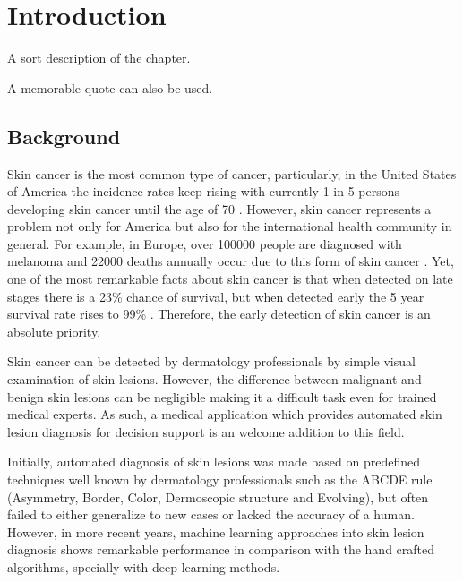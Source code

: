 

\chapter{Introduction}
\label{chapter:introduction}

\begin{introduction}
    A sort description of the chapter.
    
    A memorable quote can also be used.
\end{introduction}

\section{Background}
    Skin cancer is the most common type of cancer, particularly, in the United States of America the incidence rates keep rising with currently 1 in 5 persons developing skin cancer until the age of 70 \cite{Foundation2019}. However, skin cancer represents a problem not only for America but also for the international health community in general. For example, in Europe, over 100000 people are diagnosed with melanoma and 22000 deaths annually occur due to this form of skin cancer \cite{Bray2018}.  Yet, one of the most remarkable facts about skin cancer is that when detected on late stages there is a 23\% chance of survival, but when detected early the 5 year survival rate rises to 99\% \cite{Foundation2019}. Therefore, the early detection of skin cancer is an absolute priority. \par
    Skin cancer can be detected by dermatology professionals by simple visual examination of skin lesions. However, the difference between malignant and benign skin lesions can be negligible making it a difficult task even for trained medical experts. As such, a medical application which provides automated skin lesion diagnosis for decision support is an welcome addition to this field. \par
    Initially, automated diagnosis of skin lesions was made based on predefined techniques well known by dermatology professionals such as the ABCDE rule (Asymmetry, Border, Color, Dermoscopic structure and Evolving), but often failed to either generalize to new cases or lacked the accuracy of a human. However, in more recent years, machine learning approaches into skin lesion diagnosis shows remarkable performance in comparison with the hand crafted algorithms, specially with deep learning methods\cite{Esteva2017}\cite{Haenssle2018}. 


